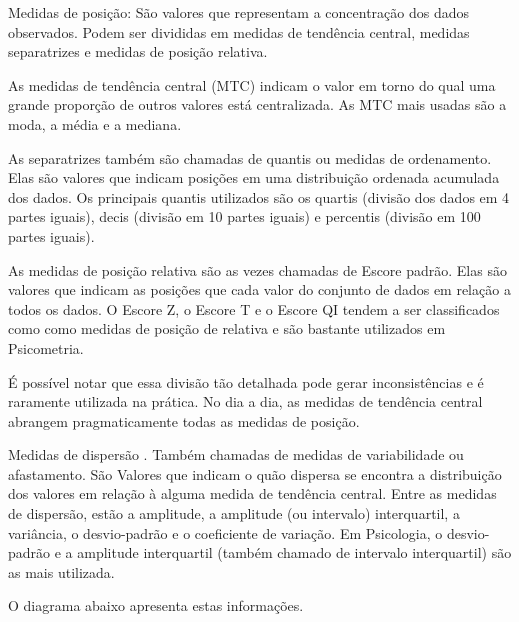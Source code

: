 \documentclass[
]{book}
\begin{document}
Medidas de posição: São valores que representam a concentração dos dados
observados. Podem ser divididas em medidas de tendência central, medidas
separatrizes e medidas de posição relativa.

As medidas de tendência central (MTC) indicam o valor em torno do qual
uma grande proporção de outros valores está centralizada. As MTC mais
usadas são a moda, a média e a mediana.

As separatrizes também são chamadas de quantis ou medidas de
ordenamento. Elas são valores que indicam posições em uma distribuição
ordenada acumulada dos dados. Os principais quantis utilizados são os
quartis (divisão dos dados em 4 partes iguais), decis (divisão em 10
partes iguais) e percentis (divisão em 100 partes iguais).

As medidas de posição relativa são as vezes chamadas de Escore padrão.
Elas são valores que indicam as posições que cada valor do conjunto de
dados em relação a todos os dados. O Escore Z, o Escore T e o Escore QI
tendem a ser classificados como como medidas de posição de relativa e
são bastante utilizados em Psicometria.

É possível notar que essa divisão tão detalhada pode gerar
inconsistências e é raramente utilizada na prática. No dia a dia, as
medidas de tendência central abrangem pragmaticamente todas as medidas
de posição.

Medidas de dispersão . Também chamadas de medidas de variabilidade ou
afastamento. São Valores que indicam o quão dispersa se encontra a
distribuição dos valores em relação à alguma medida de tendência
central. Entre as medidas de dispersão, estão a amplitude, a amplitude
(ou intervalo) interquartil, a variância, o desvio-padrão e o
coeficiente de variação. Em Psicologia, o desvio-padrão e a amplitude
interquartil (também chamado de intervalo interquartil) são as mais
utilizada.

O diagrama abaixo apresenta estas informações.
\end{document}
